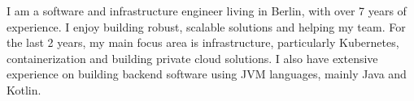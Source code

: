 
\begin{cvparagraph}

    I am a software and infrastructure engineer living in Berlin, with over 7 years of experience.
    \newline
    I enjoy building robust, scalable solutions and helping my team.
    \newline
    For the last 2 years, my main focus area is infrastructure, particularly Kubernetes,
    containerization and building private cloud solutions.
    \newline
    I also have extensive experience on building backend software using JVM languages, mainly Java and Kotlin.

\end{cvparagraph}
